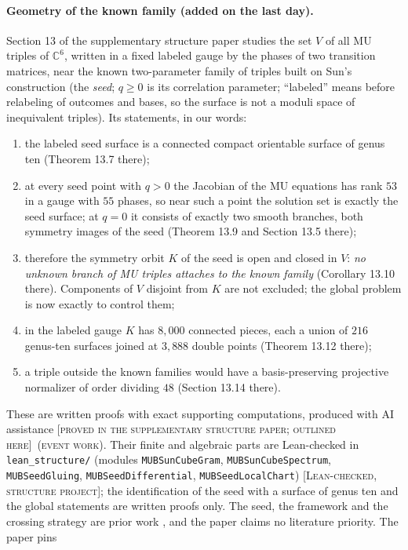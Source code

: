 \documentclass[11pt]{article}
\newcommand{\C}{\mathbb{C}}
\newcommand{\st}[1]{\textsc{[#1]}}
\newcommand{\stlean}{\st{Lean-checked, structure project}}
\newcommand{\stsupp}{\st{proved in the supplementary structure paper; outlined here}}
\newcommand{\event}{\textsc{(event work)}}
\theoremstyle{definition}
\theoremstyle{remark}
\begin{document}
\paragraph{Geometry of the known family (added on the last day).}\label{sec:geometry}
Section 13 of the supplementary structure paper studies the set $V$ of all MU triples of $\C^6$, written in a fixed
labeled gauge by the phases of two transition matrices, near the known two-parameter family of triples built on Sun's
construction \cite{Sun26} (the \emph{seed}; $q\ge0$ is its correlation parameter; ``labeled'' means before relabeling of outcomes and bases, so the surface is not a moduli space of inequivalent triples). Its statements, in our words:
\begin{enumerate}[label=(\roman*)]
\item the labeled seed surface is a connected compact orientable surface of genus ten (Theorem 13.7 there);
\item at every seed point with $q>0$ the Jacobian of the MU equations has rank $53$ in a gauge with $55$ phases, so
near such a point the solution set is exactly the seed surface; at $q=0$ it consists of exactly two smooth branches,
both symmetry images of the seed (Theorem 13.9 and Section 13.5 there);
\item therefore the symmetry orbit $K$ of the seed is open and closed in $V$: \emph{no unknown branch of MU triples
attaches to the known family} (Corollary 13.10 there). Components of $V$ disjoint from $K$ are not excluded; the
global problem is now exactly to control them;
\item in the labeled gauge $K$ has $8{,}000$ connected pieces, each a union of $216$ genus-ten surfaces joined at
$3{,}888$ double points (Theorem 13.12 there);
\item a triple outside the known families would have a basis-preserving projective normalizer of order dividing
$48$ (Section 13.14 there).
\end{enumerate}
These are written proofs with exact supporting computations, produced with AI assistance \stsupp\ \event. Their finite and algebraic parts are
Lean-checked in \texttt{lean\_structure/} (modules \texttt{MUBSunCubeGram}, \texttt{MUBSunCubeSpectrum}, \texttt{MUBSeedGluing}, \texttt{MUBSeedDifferential}, \texttt{MUBSeedLocalChart}) \stlean; the identification of the seed with a surface of genus ten and the global statements are written proofs only. The seed, the framework and the
crossing strategy are prior work \cite{Sun26,CWT}, and the paper claims no literature priority. The paper pins
\end{document}
